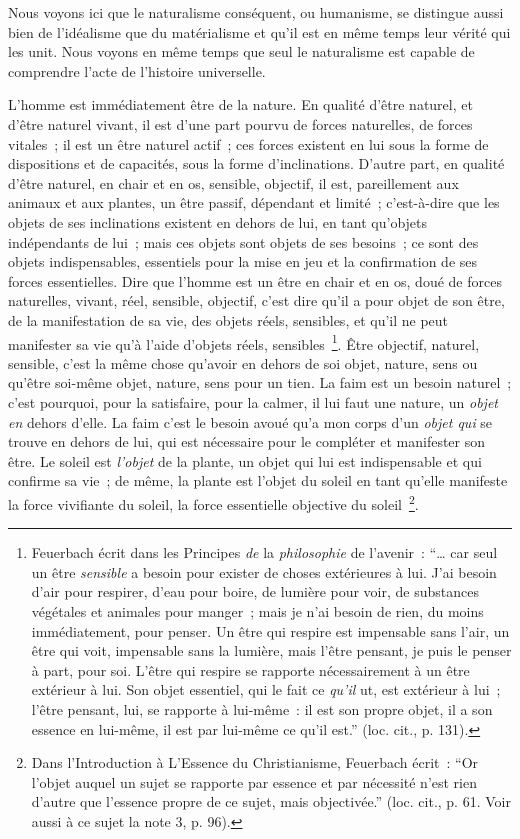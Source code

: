 \documentclass[french,twoside]{book} %
\begin{document}
Nous voyons ici que le naturalisme conséquent, ou humanisme, se distingue aussi bien de l’idéalisme que du matérialisme et qu’il est en même temps leur vérité qui les unit. Nous voyons en même temps que seul le naturalisme est capable de comprendre l’acte de l’histoire universelle.\par
L’homme est immédiatement être de la nature. En qualité d’être naturel, et d’être naturel vivant, il est d’une part pourvu de forces naturelles, de forces vitales ; il est un être naturel actif ; ces forces existent en lui sous la forme de dispositions et de capacités, sous la forme d’inclinations. D’autre part, en qualité d’être naturel, en chair et en os, sensible, objectif, il est, pareillement aux animaux et aux plantes, un être passif, dépendant et limité ; c’est-à-dire que les objets de ses inclinations existent en dehors de lui, en tant qu’objets indépendants de lui ; mais ces objets sont objets de ses besoins ; ce sont des objets indispensables, essentiels pour la mise en jeu et la confirmation de ses forces essentielles. Dire que l’homme est un être en chair et en os, doué de forces naturelles, vivant, réel, sensible, objectif, c’est dire qu’il a pour objet de son être, de la manifestation de sa vie, des objets réels, sensibles, et qu’il ne peut manifester sa vie qu’à l’aide d’objets réels, sensibles \footnote{Feuerbach écrit dans les Principes \emph{de} la \emph{philosophie} de l’avenir : “… car seul un être \emph{sensible} a besoin pour exister de choses extérieures à lui. J’ai besoin d’air pour respirer, d’eau pour boire, de lumière pour voir, de substances végétales et animales pour manger ; mais je n’ai besoin de rien, du moins immédiatement, pour penser. Un être qui respire est impensable sans l’air, un être qui voit, impensable sans la lumière, mais l’être pensant, je puis le penser à part, pour soi. L’être qui respire se rapporte nécessairement à un être extérieur à lui. Son objet essentiel, qui le fait ce \emph{qu’il} ut, est extérieur à lui ; l’être pensant, lui, se rapporte à lui-même : il est son propre objet, il a son essence en lui-même, il est par lui-même ce qu’il est.” (loc. cit., p. 131).}. Être objectif, naturel, sensible, c’est la même chose qu’avoir en dehors de soi objet, nature, sens ou qu’être soi-même objet, nature, sens pour un tien. La faim est un besoin naturel ; c’est pourquoi, pour la satisfaire, pour la calmer, il lui faut une nature, un \emph{objet en} dehors d’elle. La faim c’est le besoin avoué qu’a mon corps d’un \emph{objet qui} se trouve en dehors de lui, qui est nécessaire pour le compléter et manifester son être. Le soleil est \emph{l’objet} de la plante, un objet qui lui est indispensable et qui confirme sa vie ; de même, la plante est l’objet du soleil en tant qu’elle manifeste la force vivifiante du soleil, la force essentielle objective du soleil \footnote{Dans l’Introduction à L’Essence du Christianisme, Feuerbach écrit : “Or l’objet auquel un sujet se rapporte par essence et par nécessité n’est rien d’autre que l’essence propre de ce sujet, mais objectivée.” (loc. cit., p. 61. Voir aussi à ce sujet la note 3, p. 96).}.\par
\end{document}
